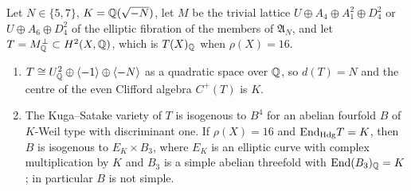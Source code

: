 \begin{proposition}\label{prop:frickeks}
Let $N\in\{5,7\}$, $K=\mathbb{Q}(\sqrt{-N})$, let $M$ be the trivial lattice $U\oplus A_{4}\oplus A_{1}^{2}\oplus D_{4}^{2}$ or $U\oplus A_{6}\oplus D_{4}^{2}$ of the elliptic fibration of the members of $\mathfrak{A}_{N}$, and let $T=M^{\perp}_{\mathbb{Q}}\subset H^{2}(X,\mathbb{Q})$, which is $T(X)_{\mathbb{Q}}$ when $\rho(X)=16$.
\begin{enumerate}[label=\textup{(\roman*)},leftmargin=2.4em,itemsep=2pt]
\item $T\cong U_{\mathbb{Q}}^{2}\oplus\langle-1\rangle\oplus\langle-N\rangle$ as a quadratic space over $\mathbb{Q}$, so $d(T)=N$ and the centre of the even Clifford algebra $C^{+}(T)$ is $K$.
\item The Kuga--Satake variety of $T$ is isogenous to $B^{4}$ for an abelian fourfold $B$ of $K$-Weil type with discriminant one. If $\rho(X)=16$ and $\mathrm{End}_{\mathrm{Hdg}}T=K$, then $B$ is isogenous to $E_{K}\times B_{3}$, where $E_{K}$ is an elliptic curve with complex multiplication by $K$ and $B_{3}$ is a simple abelian threefold with $\mathrm{End}(B_{3})_{\mathbb{Q}}=K$; in particular $B$ is not simple.
\end{enumerate}
\end{proposition}

